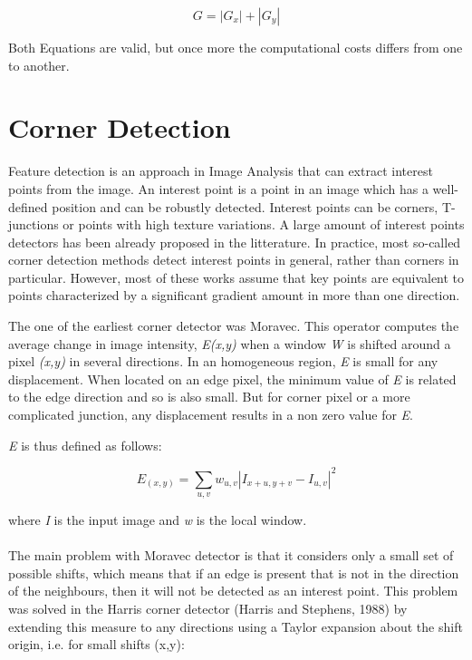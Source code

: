 \documentclass{article}
\begin{document}
\begin{equation}
G = | G_x | + | G_y |
\label{equa:norm2}
\end{equation}

Both Equations are valid, but once more the computational costs differs from one to another.

\section{Corner Detection}
	
	Feature detection is an approach in Image Analysis that can extract interest points from the image. An interest point is a point in an image which has a well-defined position and can be robustly detected. Interest points can be corners, T-junctions or points with high texture variations. A large amount of interest points detectors has been already proposed in the litterature. In practice, most so-called corner detection methods detect interest points in general, rather than corners in particular. However, most of these works assume that key points are equivalent to points characterized by a significant gradient amount in more than one direction.

	The one of the earliest corner detector was Moravec. This operator computes the average change in image intensity, \textit{E(x,y)} when a window \textit{W} is shifted around a pixel \textit{(x,y)} in several directions. In an homogeneous region, \textit{E} is small for any displacement. When located on an edge pixel, the minimum value of \textit{E} is related to the edge direction and so is also small. But for corner pixel or a more complicated junction, any displacement results in a non zero value for \textit{E}.
	
	\textit{E} is thus defined as follows:

	\begin{equation}
	E_(x,y) = \sum_{u,v} w_{u,v} |I_{x+u,y+v} - I_{u,v}|^2
	\end{equation}

	where \textit{I} is the input image and \textit{w} is the local window.
	\\\\
	The main problem with Moravec detector is that it considers only a small set of possible shifts, which means that if an edge is present that is not in the direction of the neighbours, then it will not be detected as an interest point. This problem was solved in the Harris corner detector (Harris and Stephens, 1988) by extending this measure to any directions using a Taylor expansion about the shift origin, i.e. for small shifts (x,y):
\end{document}
